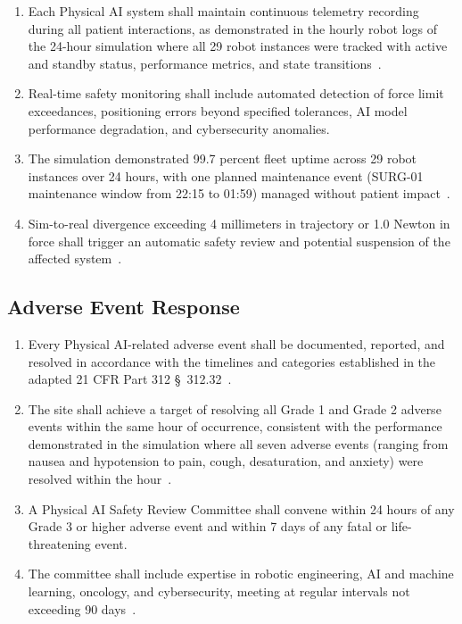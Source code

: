 \begin{enumerate}[label=(\alph*)]
\item Each Physical AI system shall maintain continuous telemetry recording
  during all patient interactions, as demonstrated in the hourly robot logs of
  the 24-hour simulation where all 29 robot instances were tracked with
  active and standby status, performance metrics, and state
  transitions~\cite{newtrial2026}.

\item Real-time safety monitoring shall include automated detection of force
  limit exceedances, positioning errors beyond specified tolerances, AI model
  performance degradation, and cybersecurity anomalies.

\item The simulation demonstrated 99.7 percent fleet uptime across 29 robot
  instances over 24 hours, with one planned maintenance event (SURG-01
  maintenance window from 22:15 to 01:59) managed without patient
  impact~\cite{newtrial2026}.

\item Sim-to-real divergence exceeding 4 millimeters in trajectory or 1.0
  Newton in force shall trigger an automatic safety review and potential
  suspension of the affected system~\cite{cfr312adapt}.
\end{enumerate}

\subsection{Adverse Event Response}

\begin{enumerate}[label=(\alph*)]
\item Every Physical AI-related adverse event shall be documented, reported, and
  resolved in accordance with the timelines and categories established in the
  adapted 21 CFR Part 312 \S~312.32~\cite{cfr312adapt}.

\item The site shall achieve a target of resolving all Grade 1 and Grade 2
  adverse events within the same hour of occurrence, consistent with the
  performance demonstrated in the simulation where all seven adverse events
  (ranging from nausea and hypotension to pain, cough, desaturation, and
  anxiety) were resolved within the hour~\cite{newtrial2026}.

\item A Physical AI Safety Review Committee shall convene within 24 hours of any
  Grade 3 or higher adverse event and within 7 days of any fatal or
  life-threatening event.

\item The committee shall include expertise in robotic engineering, AI and
  machine learning, oncology, and cybersecurity, meeting at regular intervals
  not exceeding 90 days~\cite{cfr312adapt}.
\end{enumerate}


